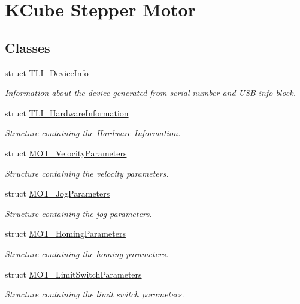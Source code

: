 \hypertarget{group___k_cube_stepper}{}\section{K\+Cube Stepper Motor}
\label{group___k_cube_stepper}
\subsection*{Classes}
\begin{DoxyCompactItemize}
\item 
struct \hyperlink{struct_t_l_i___device_info}{T\+L\+I\+\_\+\+Device\+Info}
\begin{DoxyCompactList}\small\item\em Information about the device generated from serial number and U\+SB info block. \end{DoxyCompactList}\item 
struct \hyperlink{struct_t_l_i___hardware_information}{T\+L\+I\+\_\+\+Hardware\+Information}
\begin{DoxyCompactList}\small\item\em Structure containing the Hardware Information. \end{DoxyCompactList}\item 
struct \hyperlink{struct_m_o_t___velocity_parameters}{M\+O\+T\+\_\+\+Velocity\+Parameters}
\begin{DoxyCompactList}\small\item\em Structure containing the velocity parameters. \end{DoxyCompactList}\item 
struct \hyperlink{struct_m_o_t___jog_parameters}{M\+O\+T\+\_\+\+Jog\+Parameters}
\begin{DoxyCompactList}\small\item\em Structure containing the jog parameters. \end{DoxyCompactList}\item 
struct \hyperlink{struct_m_o_t___homing_parameters}{M\+O\+T\+\_\+\+Homing\+Parameters}
\begin{DoxyCompactList}\small\item\em Structure containing the homing parameters. \end{DoxyCompactList}\item 
struct \hyperlink{struct_m_o_t___limit_switch_parameters}{M\+O\+T\+\_\+\+Limit\+Switch\+Parameters}
\begin{DoxyCompactList}\small\item\em Structure containing the limit switch parameters. \end{DoxyCompactList}\item 

\end{DoxyCompactItemize}
